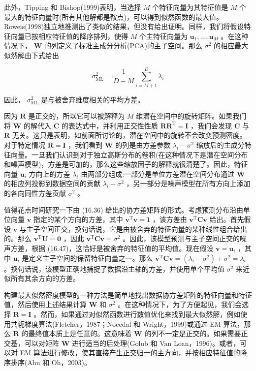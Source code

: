 \documentclass[10pt]{article}
\begin{document}
此外，Tipping 和 Bishop(1999)表明，当选择 \(M\) 个特征向量为其特征值是 \(M\) 个最大的特征向量时(所有其他解都是鞍点)，可以得到似然函数的最大值。Roweis(1998)独立地推测出了类似的结果，但没有给出证明。同样，我们将假设特征向量已按相应特征值的降序排列，使得 \(M\) 个主特征向量为 \({\mathbf{u}}_{1},\ldots ,{\mathbf{u}}_{M}\) 。在这种情况下， \(\mathbf{W}\) 的列定义了标准主成分分析(PCA)的主子空间。那么 \({\sigma }^{2}\) 的相应最大似然解由下式给出

\[
{\sigma }_{\mathrm{{ML}}}^{2} = \frac{1}{D - M}\mathop{\sum }\limits_{{i = M + 1}}^{D}{\lambda }_{i} \tag{16.47}
\]

因此， \({\sigma }_{\mathrm{{ML}}}^{2}\) 是与被舍弃维度相关的平均方差。

因为 \(\mathbf{R}\) 是正交的，所以它可以被解释为 \(M\) 维潜在空间中的旋转矩阵。如果我们将 \(\mathbf{W}\) 的解代入 \(\mathbf{C}\) 的表达式中，并利用正交性性质 \(\mathbf{R}{\mathbf{R}}^{\mathrm{T}} = \mathbf{I}\) ，我们会发现 \(\mathbf{C}\) 与 \(\mathbf{R}\) 无关。这只是表明，如前面所讨论的，潜在空间中的旋转不会改变预测密度。对于特定情况 \(\mathbf{R} = \mathbf{I}\) ，我们看到 \(\mathbf{W}\) 的列是由方差参数 \({\lambda }_{i} - {\sigma }^{2}\) 缩放后的主成分特征向量。一旦我们认识到对于独立高斯分布的卷积(在这种情况下是潜在空间分布和噪声模型)，方差是可加的，那么这些缩放因子的解释就很清楚了。因此，特征向量 \({\mathbf{u}}_{i}\) 方向上的方差 \({\lambda }_{i}\) 由两部分组成:一部分是单位方差潜在空间分布通过 \(\mathbf{W}\) 的相应列投影到数据空间的贡献 \({\lambda }_{i} - {\sigma }^{2}\) ，另一部分是噪声模型在所有方向上添加的各向同性方差贡献 \({\sigma }^{2}\) 。

值得花点时间研究一下由 (16.36) 给出的协方差矩阵的形式。考虑预测分布沿由单位向量 \(\mathbf{v}\) 指定的某个方向的方差，其中 \({\mathbf{v}}^{\mathrm{T}}\mathbf{v} = 1\) ，该方差由 \({\mathbf{v}}^{\mathrm{T}}\mathbf{{Cv}}\) 给出。首先假设 \(\mathbf{v}\) 与主子空间正交，换句话说，它是由被舍弃的特征向量的某种线性组合给出的。那么 \({\mathbf{v}}^{\mathrm{T}}\mathbf{U} = \mathbf{0}\) ，因此 \({\mathbf{v}}^{\mathrm{T}}\mathbf{{Cv}} = {\sigma }^{2}\) 。因此，该模型预测与主子空间正交的噪声方差，根据 (16.47)，这恰好是被舍弃的特征值的平均值。现在假设 \(\mathbf{v} = {\mathbf{u}}_{i}\) ，其中 \({\mathbf{u}}_{i}\) 是定义主子空间的保留特征向量之一。那么 \({\mathbf{v}}^{\mathrm{T}}\mathbf{{Cv}} = \left( {{\lambda }_{i} - {\sigma }^{2}}\right)  + {\sigma }^{2} = {\lambda }_{i}\) 。换句话说，该模型正确地捕捉了数据沿主轴的方差，并使用单个平均值 \({\sigma }^{2}\) 来近似所有其余方向的方差。

构建最大似然密度模型的一种方法是简单地找出数据协方差矩阵的特征向量和特征值，然后使用上述结果计算 \(\mathbf{W}\) 和 \({\sigma }^{2}\) 。在这种情况下，为了方便起见，我们会选择 \(\mathbf{R} = \mathbf{I}\) 。然而，如果通过对似然函数进行数值优化来找到最大似然解，例如使用共轭梯度算法(Fletcher，1987；Nocedal 和 Wright，1999)或通过 EM 算法，那么 \(\mathbf{R}\) 的最终值本质上是任意的。这意味着 \(\mathbf{W}\) 的列不一定是正交的。如果需要正交基，可以对矩阵 \(\mathbf{W}\) 进行适当的后处理(Golub 和 Van Loan，1996)。或者，可以对 EM 算法进行修改，使其直接产生正交归一的主方向，并按相应特征值的降序排序(Ahn 和 Oh，2003)。
\end{document}
